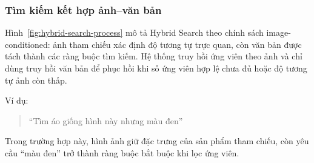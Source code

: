 \par\medskip\noindent
\begin{minipage}{\textwidth}
\subsubsection{Tìm kiếm kết hợp ảnh--văn bản}

Hình~\ref{fig:hybrid-search-process} mô tả Hybrid Search theo chính sách image-conditioned: ảnh tham chiếu xác định độ tương tự
trực quan, còn văn bản được tách thành các ràng buộc tìm kiếm. Hệ thống truy hồi ứng
viên theo ảnh và chỉ dùng truy hồi văn bản để phục hồi khi số ứng viên hợp lệ chưa đủ
hoặc độ tương tự ảnh còn thấp.

Ví dụ:
\begin{quote}
“Tìm áo giống hình này nhưng màu đen”
\end{quote}

Trong trường hợp này, hình ảnh giữ đặc trưng của sản phẩm tham chiếu, còn yêu cầu
``màu đen'' trở thành ràng buộc bắt buộc khi lọc ứng viên.





\centering

\begin{tikzpicture}[
    font=\small,
    >=Stealth,
    process/.style={
        draw,
        rounded corners,
        minimum height=0.82cm,
        text width=4.7cm,
        align=center,
        fill=green!10
    },
    embedding/.style={process, fill=purple!10},
    storage/.style={process, fill=orange!15},
    decision/.style={
        diamond,
        draw,
        aspect=2.5,
        text width=3.1cm,
        align=center,
        inner sep=1pt,
        fill=yellow!12
    },
    flow/.style={->, thick}
]


\end{tikzpicture}
\end{minipage}
